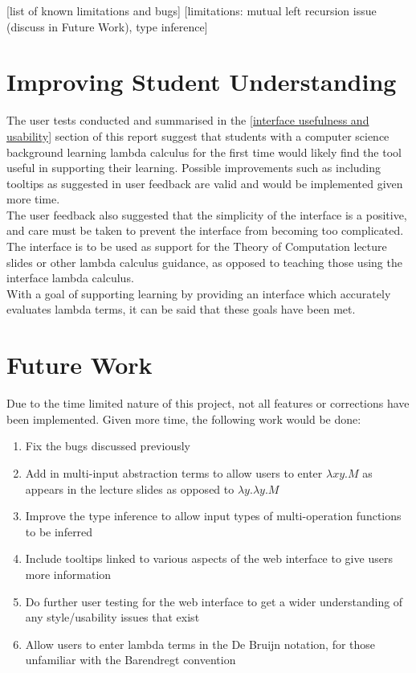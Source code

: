 \documentclass[a4paper,12pt]{report}
\begin{document}
[list of known limitations and bugs]
[limitations: mutual left recursion issue (discuss in Future Work), type inference]

\section{Improving Student Understanding}
The user tests conducted and summarised in the \ref{interface usefulness and usability} section of this report suggest that students with a computer science background learning lambda calculus for the first time would likely find the tool useful in supporting their learning. Possible improvements such as including tooltips as suggested in user feedback are valid and would be implemented given more time.\\

The user feedback also suggested that the simplicity of the interface is a positive, and care must be taken to prevent the interface from becoming too complicated. The interface is to be used as support for the Theory of Computation lecture slides or other lambda calculus guidance, as opposed to teaching those using the interface lambda calculus.\\

With a goal of supporting learning by providing an interface which accurately evaluates lambda terms, it can be said that these goals have been met.\\

\section{Future Work}
Due to the time limited nature of this project, not all features or corrections have been implemented. Given more time, the following work would be done:

\begin{enumerate}
	\item Fix the bugs discussed previously
	\item Add in multi-input abstraction terms to allow users to enter $\lambda xy.M$ as appears in the lecture slides \cite{Gay2019} as opposed to $\lambda y.\lambda y.M$
	\item Improve the type inference to allow input types of multi-operation functions to be inferred
	\item Include tooltips linked to various aspects of the web interface to give users more information
	\item Do further user testing for the web interface to get a wider understanding of any style/usability issues that exist 
	\item Allow users to enter lambda terms in the De Bruijn notation, for those unfamiliar with the Barendregt convention
\end{enumerate}

\printbibliography
\end{document}
